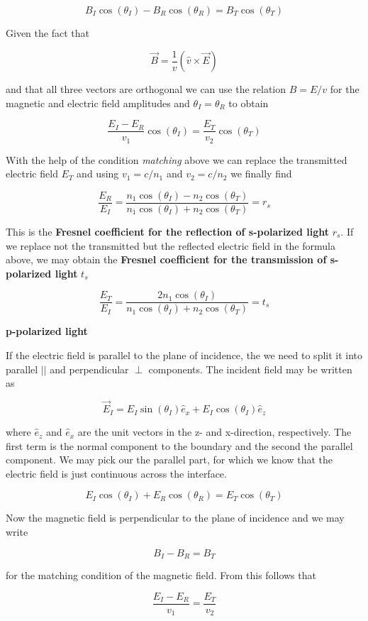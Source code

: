 \documentclass[
  a4paper,
]{book}
\begin{document}
\[
B_I\cos(\theta_I)-B_R\cos(\theta_R)=B_T\cos(\theta_T)
\]

Given the fact that

\[
\vec{B}=\frac{1}{v}(\hat{v}\times \vec{E})
\]

and that all three vectors are orthogonal we can use the relation
\(B=E/v\) for the magnetic and electric field amplitudes and
\(\theta_I=\theta_R\) to obtain

\[
\frac{E_I-E_R}{v_1}\cos(\theta_I)=\frac{E_T}{v_2}\cos(\theta_T)
\]

With the help of the condition \emph{matching} above we can replace the
transmitted electric field \(E_T\) and using \(v_1=c/n_1\) and
\(v_2=c/n_2\) we finally find

\[
\frac{E_R}{E_I}=\frac{n_1\cos(\theta_I)-n_2\cos(\theta_T)}{n_1\cos(\theta_I)+n_2\cos(\theta_T)}=r_s
\]

This is the \textbf{Fresnel coefficient for the reflection of
s-polarized light} \(r_s\). If we replace not the transmitted but the
reflected electric field in the formula above, we may obtain the
\textbf{Fresnel coefficient for the transmission of s-polarized light}
\(t_s\)

\[
\frac{E_T}{E_I}=\frac{2n_1\cos(\theta_I)}{n_1\cos(\theta_I)+n_2\cos(\theta_T)}=t_s
\]

\textbf{p-polarized light}

If the electric field is parallel to the plane of incidence, the we need
to split it into parallel \(||\) and perpendicular \(\perp\) components.
The incident field may be written as

\[
\vec{E}_I=E_I\sin(\theta_I)\hat{e}_x+E_I\cos(\theta_I)\hat{e}_z
\]

where \(\hat{e}_z\) and \(\hat{e}_x\) are the unit vectors in the z- and
x-direction, respectively. The first term is the normal component to the
boundary and the second the parallel component. We may pick our the
parallel part, for which we know that the electric field is just
continuous across the interface.

\[
E_I\cos(\theta_I)+E_R\cos(\theta_R)=E_T\cos(\theta_T)
\]

Now the magnetic field is perpendicular to the plane of incidence and we
may write

\[
B_I-B_R=B_T
\]

for the matching condition of the magnetic field. From this follows that

\[
\frac{E_I-E_R}{v_1}=\frac{E_T}{v_2}
\]
\end{document}
